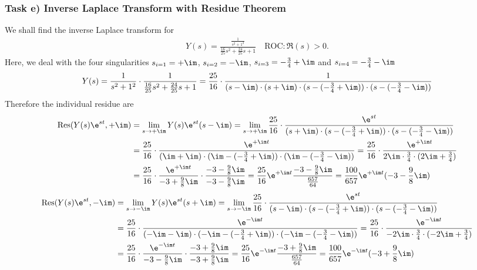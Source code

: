 \subsubsection{Task e) Inverse Laplace Transform with Residue Theorem}
We shall find the inverse Laplace transform for
\begin{align}
	Y(s) = \frac{\frac{1}{s^2 + 1^2}}{\frac{16}{25} s^2 + \frac{24}{25} s + 1}
\quad \text{ROC}: \Re(s) > 0
	.
\end{align}
Here, we deal with the four singularities
$s_{i=1}=+\im$, $s_{i=2}=-\im$, $s_{i=3}=-\frac{3}{4}+\im$ and $s_{i=4}=-\frac{3}{4}-\im$
\begin{align}
	Y(s) = \frac{1}{s^2+1^2}\cdot\frac{1}{\frac{16}{25}s^2+\frac{24}{25}s+1}=\frac{25}{16}\cdot\frac{1}{(s-\im)\cdot(s+\im)\cdot(s-(-\frac{3}{4}+\im))\cdot(s-(-\frac{3}{4}-\im))}
\end{align}
Therefore the individual residue are
\begin{align}
	\mathrm{Res}(Y(s)\e^{st},+\im)&=\lim\limits_{s\rightarrow+\im}Y(s)\e^{st}(s-\im)=\lim\limits_{s\rightarrow +\im} \frac{25}{16}\cdot\frac{\e^{st}}{(s+\im)\cdot(s-(-\frac{3}{4}+\im))\cdot(s-(-\frac{3}{4}-\im))} \nonumber \\
	&= \frac{25}{16}\cdot\frac{\e^{+\im t}}{(\im+\im)\cdot(\im-(-\frac{3}{4}+\im))\cdot(\im-(-\frac{3}{4}-\im))}= \frac{25}{16}\cdot \frac{\e^{+\im t}}{2\im\cdot\frac{3}{4}\cdot(2\im+\frac{3}{4})} \nonumber \\
	&=\frac{25}{16}\cdot\frac{\e^{+\im t}}{-3+\frac{9}{8}\im}\cdot\frac{-3-\frac{9}{8}\im}{-3-\frac{9}{8}\im}=\frac{25}{16}\e^{+\im t}\frac{-3-\frac{9}{8}\im}{\frac{657}{64}}=\frac{100}{657}\e^{+\im t}(-3-\frac{9}{8}\im)
\end{align}
\begin{align}
	\mathrm{Res}(Y(s)\e^{st},-\im)&=\lim\limits_{s\rightarrow-\im}Y(s)\e^{st}(s+\im)=\lim\limits_{s\rightarrow -\im} \frac{25}{16}\cdot\frac{\e^{st}}{(s-\im)\cdot(s-(-\frac{3}{4}+\im))\cdot(s-(-\frac{3}{4}-\im))} \nonumber \\
	&= \frac{25}{16}\cdot\frac{\e^{-\im t}}{(-\im-\im)\cdot(-\im-(-\frac{3}{4}+\im))\cdot(-\im-(-\frac{3}{4}-\im))}= \frac{25}{16}\cdot \frac{\e^{-\im t}}{-2\im\cdot\frac{3}{4}\cdot(-2\im+\frac{3}{4})} \nonumber \\
	&=\frac{25}{16}\cdot\frac{\e^{-\im t}}{-3-\frac{9}{8}\im}\cdot\frac{-3+\frac{9}{8}\im}{-3+\frac{9}{8}\im}=\frac{25}{16}\e^{-\im t}\frac{-3+\frac{9}{8}\im}{\frac{657}{64}}=\frac{100}{657}\e^{-\im t}(-3+\frac{9}{8}\im)
\end{align}
